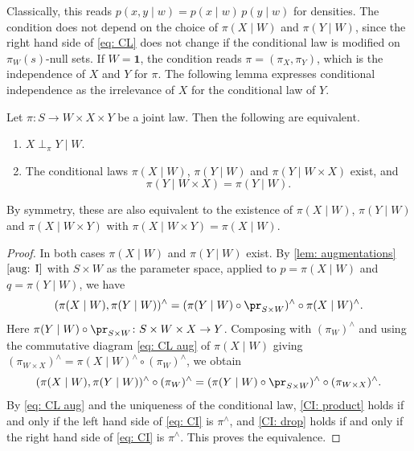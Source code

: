\documentclass[12pt,reqno]{amsart}%
\theoremstyle{plain}
\theoremstyle{definition}
\def\bsone{\boldsymbol{1}}
\begin{document}
Classically, this reads $p(x,y\mid w)=p(x\mid w)\,p(y\mid w)$ for densities.
The condition does not depend on the choice of $\pi(X\mid W)$ and $\pi(Y\mid W)$,
since the right hand side of \eqref{eq: CL} does not change if the conditional law is modified on $\pi_W(s)$-null sets.
If $W=\bsone$, the condition reads $\pi=(\pi_X,\pi_Y)$, which is the independence of $X$ and $Y$ for $\pi$.
The following lemma expresses conditional independence as the irrelevance of $X$ for the conditional law of $Y$.

\begin{lemma}\label{lem: CI}
	Let $\pi\colon S\rightarrow W\times X\times Y$ be a joint law.
	Then the following are equivalent.
	\begin{enumerate}[label=(\roman*)]
		\item\label{CI: product} $X\perp_\pi Y\mid W$.
		\item\label{CI: drop} The conditional laws $\pi(X\mid W)$, $\pi(Y\mid W)$ and $\pi(Y\mid W\times X)$ exist, and
		\[
			\pi(Y\mid W\times X)=\pi(Y\mid W).
		\]
	\end{enumerate}
	By symmetry, these are also equivalent to the existence of $\pi(X\mid W)$, $\pi(Y\mid W)$ and $\pi(X\mid W\times Y)$
	with $\pi(X\mid W\times Y)=\pi(X\mid W)$.
\end{lemma}

\begin{proof}
	In both cases $\pi(X\mid W)$ and $\pi(Y\mid W)$ exist.
	By \cref{lem: augmentations}~$\ref{aug: I}$ with $S\times W$ as the parameter space,
	applied to $p=\pi(X\mid W)$ and $q=\pi(Y\mid W)$, we have
	\[
		(\pi(X\mid W),\pi(Y\mid W))^\wedge=(\pi(Y\mid W)\circ\pr_{S\times W})^\wedge\circ\pi(X\mid W)^\wedge.
	\]
	Here $\pi(Y\mid W)\circ\pr_{S\times W}\colon S\times W\times X\rightarrow Y$.
	Composing with $(\pi_W)^\wedge$ and using the commutative diagram \eqref{eq: CL aug}
	 of $\pi(X\mid W)$
	giving
	$(\pi_{W\times X})^\wedge=\pi(X\mid W)^\wedge\circ(\pi_W)^\wedge$, we obtain
	\begin{equation}\label{eq: CI}
		(\pi(X\mid W),\pi(Y\mid W))^\wedge\circ(\pi_W)^\wedge=(\pi(Y\mid W)\circ\pr_{S\times W})^\wedge\circ(\pi_{W\times X})^\wedge.
	\end{equation}
	By \eqref{eq: CL aug} and the uniqueness of the conditional law,
	\ref{CI: product} holds if and only if the left hand side of \eqref{eq: CI} is $\pi^\wedge$,
	and \ref{CI: drop} holds if and only if the right hand side of \eqref{eq: CI} is $\pi^\wedge$.
	This proves the equivalence.
\end{proof}
\end{document}
